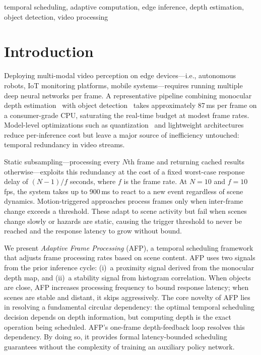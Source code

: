 \documentclass[conference]{IEEEtran}
\begin{document}
\begin{IEEEkeywords}
temporal scheduling, adaptive computation, edge inference,
depth estimation, object detection, video processing
\end{IEEEkeywords}

\section{Introduction}
\label{sec:introduction}

Deploying multi-modal video perception on edge
devices---i.e., autonomous robots, IoT monitoring platforms, mobile
systems---requires running multiple deep neural networks per frame.
A representative pipeline combining monocular depth
estimation~\cite{ranftl2020midas} with object
detection~\cite{jocher2023yolov8} takes approximately 87\,ms per
frame on a consumer-grade CPU, saturating the real-time budget at
modest frame rates. Model-level optimizations such as
quantization~\cite{jacob2018quantization} and lightweight
architectures~\cite{howard2017mobilenets} reduce per-inference cost
but leave a major source of inefficiency untouched: temporal
redundancy in video streams.

Static subsampling---processing every $N$th frame and returning
cached results otherwise---exploits this redundancy at the cost of
a fixed worst-case response delay of $(N{-}1)/f$ seconds, where $f$
is the frame rate. At $N{=}10$ and $f{=}10$\,fps, the system takes
up to 900\,ms to react to a new event regardless of scene dynamics.
Motion-triggered approaches process frames only when inter-frame
change exceeds a threshold. These adapt to scene activity but fail
when scenes change slowly or hazards are static, causing the trigger
threshold to never be reached and the response latency to grow
without bound.

We present \emph{Adaptive Frame Processing} (AFP), a temporal
scheduling framework that adjusts frame processing rates based on
scene content. AFP uses two signals from the prior inference cycle:
(i)~a proximity signal derived from the monocular depth map, and
(ii)~a stability signal from histogram correlation. When objects are
close, AFP increases processing frequency to bound response latency;
when scenes are stable and distant, it skips aggressively.
The core novelty of AFP lies in resolving a fundamental circular
dependency: the optimal temporal scheduling decision depends on
depth information, but computing depth is the exact operation being
scheduled. AFP's one-frame depth-feedback loop resolves this
dependency. By doing so, it provides formal latency-bounded
scheduling guarantees without the complexity of training an
auxiliary policy network.
\end{document}
